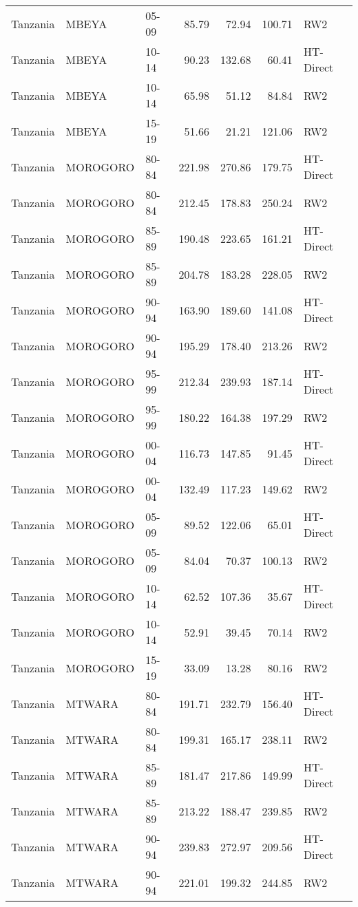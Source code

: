 \begin{longtable}{lllrrrl}
  Tanzania & MBEYA & 05-09 & 85.79 & 72.94 & 100.71 & RW2 \\ 
  Tanzania & MBEYA & 10-14 & 90.23 & 132.68 & 60.41 & HT-Direct \\ 
  Tanzania & MBEYA & 10-14 & 65.98 & 51.12 & 84.84 & RW2 \\ 
  Tanzania & MBEYA & 15-19 & 51.66 & 21.21 & 121.06 & RW2 \\ 
  Tanzania & MOROGORO & 80-84 & 221.98 & 270.86 & 179.75 & HT-Direct \\ 
  Tanzania & MOROGORO & 80-84 & 212.45 & 178.83 & 250.24 & RW2 \\ 
  Tanzania & MOROGORO & 85-89 & 190.48 & 223.65 & 161.21 & HT-Direct \\ 
  Tanzania & MOROGORO & 85-89 & 204.78 & 183.28 & 228.05 & RW2 \\ 
  Tanzania & MOROGORO & 90-94 & 163.90 & 189.60 & 141.08 & HT-Direct \\ 
  Tanzania & MOROGORO & 90-94 & 195.29 & 178.40 & 213.26 & RW2 \\ 
  Tanzania & MOROGORO & 95-99 & 212.34 & 239.93 & 187.14 & HT-Direct \\ 
  Tanzania & MOROGORO & 95-99 & 180.22 & 164.38 & 197.29 & RW2 \\ 
  Tanzania & MOROGORO & 00-04 & 116.73 & 147.85 & 91.45 & HT-Direct \\ 
  Tanzania & MOROGORO & 00-04 & 132.49 & 117.23 & 149.62 & RW2 \\ 
  Tanzania & MOROGORO & 05-09 & 89.52 & 122.06 & 65.01 & HT-Direct \\ 
  Tanzania & MOROGORO & 05-09 & 84.04 & 70.37 & 100.13 & RW2 \\ 
  Tanzania & MOROGORO & 10-14 & 62.52 & 107.36 & 35.67 & HT-Direct \\ 
  Tanzania & MOROGORO & 10-14 & 52.91 & 39.45 & 70.14 & RW2 \\ 
  Tanzania & MOROGORO & 15-19 & 33.09 & 13.28 & 80.16 & RW2 \\ 
  Tanzania & MTWARA & 80-84 & 191.71 & 232.79 & 156.40 & HT-Direct \\ 
  Tanzania & MTWARA & 80-84 & 199.31 & 165.17 & 238.11 & RW2 \\ 
  Tanzania & MTWARA & 85-89 & 181.47 & 217.86 & 149.99 & HT-Direct \\ 
  Tanzania & MTWARA & 85-89 & 213.22 & 188.47 & 239.85 & RW2 \\ 
  Tanzania & MTWARA & 90-94 & 239.83 & 272.97 & 209.56 & HT-Direct \\ 
  Tanzania & MTWARA & 90-94 & 221.01 & 199.32 & 244.85 & RW2 \\ 

\end{longtable}
